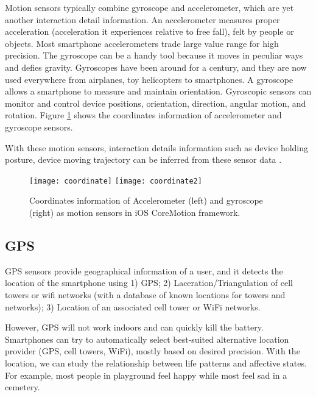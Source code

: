 Motion sensors typically combine gyroscope and accelerometer, which are yet another interaction detail information\cite{Zhang2014}. An accelerometer measures proper acceleration (acceleration it experiences relative to free fall), felt by people or objects. Most smartphone accelerometers trade large value range for high precision. The gyroscope can be a handy tool because it moves in peculiar ways and defies gravity. Gyroscopes have been around for a century, and they are now used everywhere from airplanes, toy helicopters to smartphones. A gyroscope allows a smartphone to measure and maintain orientation. Gyroscopic sensors can monitor and control device positions, orientation, direction, angular motion, and rotation. Figure \ref{fig:motion} shows the coordinates information of accelerometer and gyroscope sensors.

With these motion sensors, interaction details information such as device holding posture, device moving trajectory can be inferred from these sensor data \cite{Mottelson2016, Poria2017}.

\begin{figure}
    \centering
    \texttt{[image: coordinate]}
    \texttt{[image: coordinate2]}
    \caption{Coordinates information of Accelerometer (left) and gyroscope (right) as motion sensors in iOS CoreMotion framework.}
    \label{fig:motion}
\end{figure}

\subsection{GPS}\label{subsec:gps}

GPS sensors provide geographical information of a user, and it detects the location of the smartphone using 1) GPS\cite{tan2013connectivity}; 2) Laceration/Triangulation of cell towers or wifi networks (with a database of known locations for towers and networks)\cite{rana2015opportunistic}; 3) Location of an associated cell tower or WiFi networks\cite{Politou2017}.

However, GPS will not work indoors and can quickly kill the battery. Smartphones can try to automatically select best-suited alternative location provider (GPS, cell towers, WiFi), mostly based on desired precision. With the location, we can study the relationship between life patterns and affective states. For example, most people in playground feel happy while most feel sad in a cemetery.

